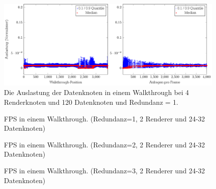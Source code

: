 \begin{figure}
\centering
\includegraphics[scale=0.75]{images/diag_cCol_red1_render4_data120_2x.pdf}
\caption{\label{fig:eval:cCol9}Die Auslastung der Datenknoten in einem Walkthrough bei 4 Renderknoten und 120 Datenknoten und Redundanz = 1.}
\end{figure}

\begin{figure}
\centering

  \caption{\label{fig:eval:fps1}FPS in einem Walkthrough. (Redundanz=1, 2 Renderer und 24-32 Datenknoten)}
\end{figure}

\begin{figure}
\centering

  \caption{\label{fig:eval:fps2}FPS in einem Walkthrough. (Redundanz=2, 2 Renderer und 24-32 Datenknoten)}
\end{figure}

\begin{figure}
\centering

  \caption{\label{fig:eval:fps3}FPS in einem Walkthrough. (Redundanz=3, 2 Renderer und 24-32 Datenknoten)}
\end{figure}
